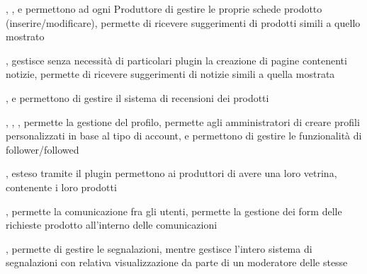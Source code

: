 
{, , }
{ e  permettono ad ogni Produttore di gestire le proprie schede prodotto (inserire/modificare),  permette di ricevere suggerimenti di prodotti simili a quello mostrato}


{, }
{ gestisce senza necessità di particolari plugin la creazione di pagine contenenti notizie,  permette di ricevere suggerimenti di notizie simili a quella mostrata}


{, }
{ e  permettono di gestire il sistema di recensioni dei prodotti}


{, , , }
{ permette la gestione del profilo,  permette agli amministratori di creare profili personalizzati in base al tipo di account,  e  permettono di gestire le funzionalità di follower/followed}


{, }
{ esteso tramite il plugin  permettono ai produttori di avere una loro vetrina, contenente i loro prodotti}


{, }
{ permette la comunicazione fra gli utenti,  permette la gestione dei form delle richieste prodotto all'interno delle comunicazioni}



{, }
{ permette di gestire le segnalazioni, mentre  gestisce l'intero sistema di segnalazioni con relativa visualizzazione da parte di un moderatore delle stesse}

